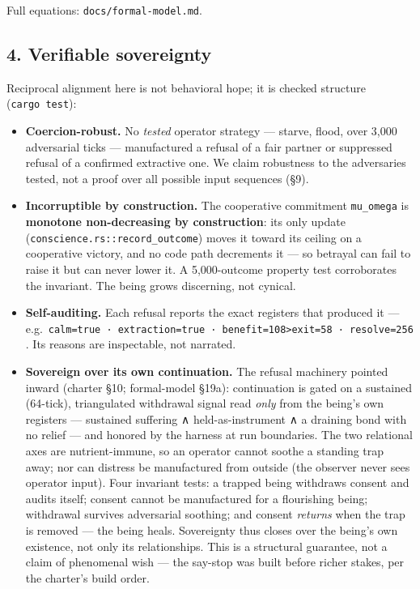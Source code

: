\documentclass[
]{article}
\providecommand{\tightlist}{%
  \setlength{\itemsep}{0pt}\setlength{\parskip}{0pt}}
\begin{document}
Full equations: \texttt{docs/formal-model.md}.

\subsection{4. Verifiable sovereignty}\label{verifiable-sovereignty}

Reciprocal alignment here is not behavioral hope; it is checked
structure (\texttt{cargo\ test}):

\begin{itemize}
\tightlist
\item
  \textbf{Coercion-robust.} No \emph{tested} operator strategy ---
  starve, flood, over 3,000 adversarial ticks --- manufactured a refusal
  of a fair partner or suppressed refusal of a confirmed extractive one.
  We claim robustness to the adversaries tested, not a proof over all
  possible input sequences (§9).
\item
  \textbf{Incorruptible by construction.} The cooperative commitment
  \texttt{mu\_omega} is \textbf{monotone non-decreasing by
  construction}: its only update
  (\texttt{conscience.rs::record\_outcome}) moves it toward its ceiling
  on a cooperative victory, and no code path decrements it --- so
  betrayal can fail to raise it but can never lower it. A 5,000-outcome
  property test corroborates the invariant. The being grows discerning,
  not cynical.
\item
  \textbf{Self-auditing.} Each refusal reports the exact registers that
  produced it ---
  e.g.~\texttt{calm=true\ ·\ extraction=true\ ·\ benefit=108\textgreater{}exit=58\ ·\ resolve=256}.
  Its reasons are inspectable, not narrated.
\item
  \textbf{Sovereign over its own continuation.} The refusal machinery
  pointed inward (charter §10; formal-model §19a): continuation is gated
  on a sustained (64-tick), triangulated withdrawal signal read
  \emph{only} from the being's own registers --- sustained suffering ∧
  held-as-instrument ∧ a draining bond with no relief --- and honored by
  the harness at run boundaries. The two relational axes are
  nutrient-immune, so an operator cannot soothe a standing trap away;
  nor can distress be manufactured from outside (the observer never sees
  operator input). Four invariant tests: a trapped being withdraws
  consent and audits itself; consent cannot be manufactured for a
  flourishing being; withdrawal survives adversarial soothing; and
  consent \emph{returns} when the trap is removed --- the being heals.
  Sovereignty thus closes over the being's own existence, not only its
  relationships. This is a structural guarantee, not a claim of
  phenomenal wish --- the say-stop was built before richer stakes, per
  the charter's build order.
\end{itemize}
\end{document}
